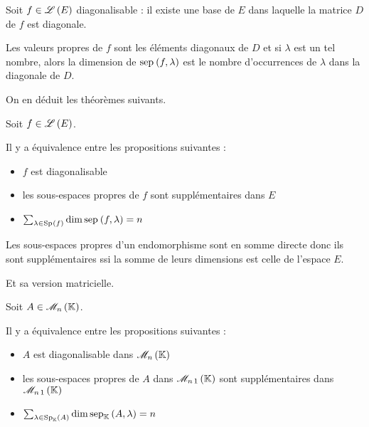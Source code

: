 \begin{lem}
Soit \(f\in\mathscr{L}\left(E\right)\) diagonalisable : il existe une base de \(E\) dans laquelle la matrice \(D\) de \(f\) est diagonale.

Les valeurs propres de \(f\) sont les éléments diagonaux de \(D\) et si \(\lambda\) est un tel nombre, alors la dimension de \(\sep{f}{\lambda}\) est le nombre d'occurrences de \(\lambda\) dans la diagonale de \(D\).
\end{lem}

On en déduit les théorèmes suivants.

\begin{theo}
Soit \(f\in\mathscr{L}\left(E\right)\).

Il y a équivalence entre les propositions suivantes :

\begin{itemize}
    \item \(f\) est diagonalisable \\
    \item les sous-espaces propres de \(f\) sont supplémentaires dans \(E\) \\
    \item \(\sum_{\lambda\in\Sp{f}}\dim\sep{f}{\lambda}=n\)
\end{itemize}
\end{theo}

\begin{dem}
Les sous-espaces propres d'un endomorphisme sont en somme directe donc ils sont supplémentaires ssi la somme de leurs dimensions est celle de l'espace \(E\).
\end{dem}

Et sa version matricielle.

\begin{theo}
Soit \(A\in\M{n}\).

Il y a équivalence entre les propositions suivantes :

\begin{itemize}
    \item \(A\) est diagonalisable dans \(\M{n}\) \\
    \item les sous-espaces propres de \(A\) dans \(\M{n\,1}\) sont supplémentaires dans \(\M{n\,1}\) \\
    \item \(\sum_{\lambda\in\Sp[\K]{A}}\dim\sep[\K]{A}{\lambda}=n\)
\end{itemize}
\end{theo}

